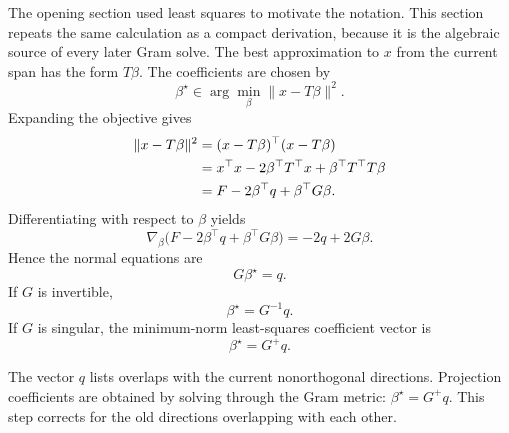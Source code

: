 \documentclass[10pt,twocolumn]{article}
\begin{document}
The opening section used least squares to motivate the notation. This section repeats the same calculation as a compact derivation, because it is the algebraic source of every later Gram solve. The best approximation to $x$ from the current span has the form $T\beta$. The coefficients are chosen by
\begin{equation}
\beta^\star\in\arg\min_\beta \|x-T\beta\|^2.
\label{eq:least_squares_problem}
\end{equation}
Expanding the objective gives
\begin{align}
\|x-T\beta\|^2
&=(x-T\beta)^\top(x-T\beta)\notag\\
&=x^\top x-2\beta^\top T^\top x+\beta^\top T^\top T\beta\notag\\
&=F-2\beta^\top q+\beta^\top G\beta.
\label{eq:ls_expansion}
\end{align}
Differentiating with respect to $\beta$ yields
\begin{equation}
\nabla_\beta\bigl(F-2\beta^\top q+\beta^\top G\beta\bigr)
=-2q+2G\beta.
\end{equation}
Hence the normal equations are
\begin{equation}
\boxed{G\beta^\star=q.}
\label{eq:normal_equations}
\end{equation}
If $G$ is invertible,
\begin{equation}
\beta^\star=G^{-1}q.
\label{eq:beta_star_inverse}
\end{equation}
If $G$ is singular, the minimum-norm least-squares coefficient vector is
\begin{equation}
\beta^\star=G^+q.
\label{eq:beta_star_pinv}
\end{equation}

\begin{cautionbox}
The vector $q$ lists overlaps with the current nonorthogonal directions. Projection coefficients are obtained by solving through the Gram metric: $\beta^\star=G^+q$. This step corrects for the old directions overlapping with each other.
\end{cautionbox}
\end{document}
